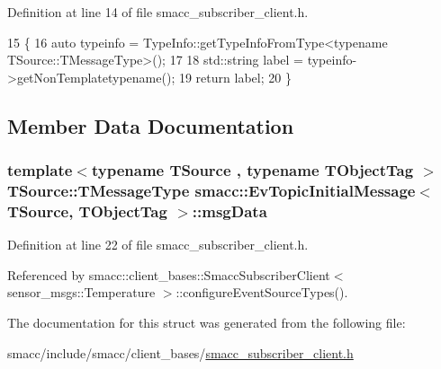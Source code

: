 Definition at line 14 of file smacc\+\_\+subscriber\+\_\+client.\+h.


\begin{DoxyCode}
15   \{
16     \textcolor{keyword}{auto} typeinfo = TypeInfo::getTypeInfoFromType<typename TSource::TMessageType>();
17 
18     std::string label = typeinfo->getNonTemplatetypename();
19     \textcolor{keywordflow}{return} label;
20   \}
\end{DoxyCode}


\subsection{Member Data Documentation}
\subsubsection[{\texorpdfstring{msg\+Data}{msgData}}]{\setlength{\rightskip}{0pt plus 5cm}template$<$typename T\+Source , typename T\+Object\+Tag $>$ T\+Source\+::\+T\+Message\+Type {\bf smacc\+::\+Ev\+Topic\+Initial\+Message}$<$ T\+Source, T\+Object\+Tag $>$\+::msg\+Data}\hypertarget{structsmacc_1_1EvTopicInitialMessage_a12015628fea3b4a0aa07e6a11fcffeda}{}\label{structsmacc_1_1EvTopicInitialMessage_a12015628fea3b4a0aa07e6a11fcffeda}


Definition at line 22 of file smacc\+\_\+subscriber\+\_\+client.\+h.



Referenced by smacc\+::client\+\_\+bases\+::\+Smacc\+Subscriber\+Client$<$ sensor\+\_\+msgs\+::\+Temperature $>$\+::configure\+Event\+Source\+Types().



The documentation for this struct was generated from the following file\+:\begin{DoxyCompactItemize}
\item 
smacc/include/smacc/client\+\_\+bases/\hyperlink{smacc__subscriber__client_8h}{smacc\+\_\+subscriber\+\_\+client.\+h}\end{DoxyCompactItemize}
